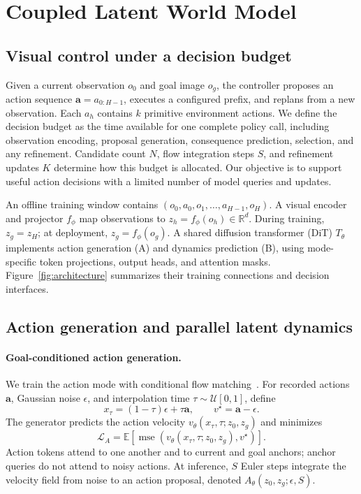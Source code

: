 \section{Coupled Latent World Model}
\label{sec:method}


\subsection{Visual control under a decision budget}
Given a current observation $o_0$ and goal image $o_g$, the controller proposes an action sequence $\mathbf a=a_{0:H-1}$, executes a configured prefix, and replans from a new observation. Each $a_h$ contains $k$ primitive environment actions. We define the decision budget as the time available for one complete policy call, including observation encoding, proposal generation, consequence prediction, selection, and any refinement. Candidate count $N$, flow integration steps $S$, and refinement updates $K$ determine how this budget is allocated. Our objective is to support useful action decisions with a limited number of model queries and updates.

An offline training window contains $(o_0,a_0,o_1,\ldots,a_{H-1},o_H)$. A visual encoder and projector $f_\phi$ map observations to $z_h=f_\phi(o_h)\in\mathbb R^d$. During training, $z_g=z_H$; at deployment, $z_g=f_\phi(o_g)$. A shared diffusion transformer (DiT) $T_\theta$ implements action generation (A) and dynamics prediction (B), using mode-specific token projections, output heads, and attention masks. Figure~\ref{fig:architecture} summarizes their training connections and decision interfaces.

\subsection{Action generation and parallel latent dynamics}
\paragraph{Goal-conditioned action generation.}
We train the action mode with conditional flow matching~\cite{lipman2022flow}. For recorded actions $\mathbf a$, Gaussian noise $\epsilon$, and interpolation time $\tau\sim\mathcal U[0,1]$, define
\begin{equation}
 x_\tau=(1-\tau)\epsilon+\tau\mathbf a,\qquad v^\star=\mathbf a-\epsilon.
\end{equation}
The generator predicts the action velocity $v_\theta(x_\tau,\tau;z_0,z_g)$ and minimizes
\begin{equation}
 \mathcal L_A=\mathbb E\left[\operatorname{mse}\left(v_\theta(x_\tau,\tau;z_0,z_g),v^\star\right)\right].
 \label{eq:action_loss}
\end{equation}
Action tokens attend to one another and to current and goal anchors; anchor queries do not attend to noisy actions. At inference, $S$ Euler steps integrate the velocity field from noise to an action proposal, denoted $A_\theta(z_0,z_g;\epsilon,S)$.

